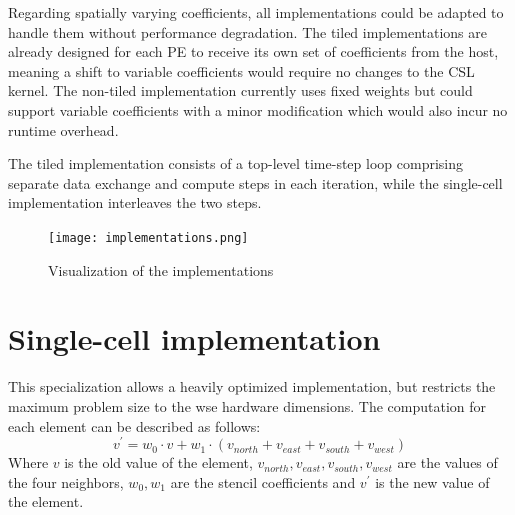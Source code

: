 Regarding spatially varying coefficients, all implementations could be adapted to handle them without performance degradation. The tiled implementations are already designed for each PE to receive its own set of coefficients from the host, meaning a shift to variable coefficients would require no changes to the CSL kernel. The non-tiled implementation currently uses fixed weights but could support variable coefficients with a minor modification which would also incur no runtime overhead.

The tiled implementation consists of a top-level time-step loop comprising separate data exchange and compute steps in each iteration, while the single-cell implementation interleaves the two steps.

\begin{figure}
    \centering
    \texttt{[image: implementations.png]}
    \caption{Visualization of the implementations}
    \label{fig:implementations}
\end{figure}

\section{Single-cell implementation}
This specialization allows a heavily optimized implementation, but restricts the maximum problem size to the \ac{wse} hardware dimensions.
The computation for each element can be described as follows:
\begin{equation}
    \label{eq:stencil_computation}
    v^{'} = w_0 \cdot v + w_1 \cdot (v_{north} + v_{east} + v_{south} + v_{west})
\end{equation}
Where $v$ is the old value of the element, $v_{north}, v_{east}, v_{south}, v_{west}$ are the values of the four neighbors, $w_0, w_1$ are the stencil coefficients and $v^{'}$ is the new value of the element.

